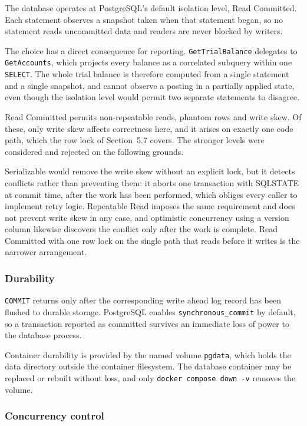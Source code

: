 \documentclass[11pt,a4paper]{article}
\newcommand{\code}[1]{\texttt{\fontsize{8.6}{10}\selectfont #1}}
\begin{document}
The database operates at PostgreSQL's default isolation level, Read Committed.
Each statement observes a snapshot taken when that statement began, so no
statement reads uncommitted data and readers are never blocked by writers.

The choice has a direct consequence for reporting. \code{GetTrialBalance}
delegates to \code{GetAccounts}, which projects every balance as a correlated
subquery within one \code{SELECT}. The whole trial balance is therefore computed
from a single statement and a single snapshot, and cannot observe a posting in a
partially applied state, even though the isolation level would permit two
separate statements to disagree.

Read Committed permits non-repeatable reads, phantom rows and write skew.
Of these, only write skew affects correctness here, and it arises on exactly one
code path, which the row lock of Section~5.7 covers. The stronger levels were
considered and rejected on the following grounds.

Serializable would remove the write skew without an explicit lock, but it
detects conflicts rather than preventing them: it aborts one transaction with
SQLSTATE \code{40001} at commit time, after the work has been performed, which
obliges every caller to implement retry logic. Repeatable Read imposes the same
requirement and does not prevent write skew in any case, and optimistic
concurrency using a version column likewise discovers the conflict only after
the work is complete. Read Committed with one row lock on the single path that
reads before it writes is the narrower arrangement.

\subsubsection*{Durability}

\code{COMMIT} returns only after the corresponding write ahead log record has
been flushed to durable storage. PostgreSQL enables \code{synchronous\_commit}
by default, so a transaction reported as committed survives an immediate loss of
power to the database process.

Container durability is provided by the named volume \code{pgdata}, which holds
the data directory outside the container filesystem. The database container may
be replaced or rebuilt without loss, and only \code{docker compose down -v}
removes the volume.

\subsubsection*{Concurrency control}
\end{document}
